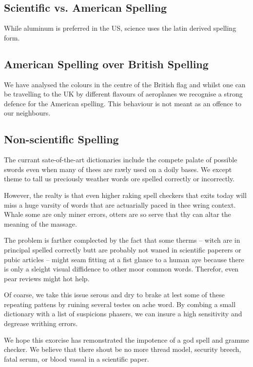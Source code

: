 \documentclass{scrartcl}
\begin{document}
\subsection{Scientific vs. American Spelling}
While aluminum is preferred in the US, science uses the latin derived spelling form.


\subsection{American Spelling over British Spelling}
We have analysed the 
colours in the 
centre of the British flag 
and whilst one can 
be travelling to the UK 
by different flavours
of aeroplanes we 
recognise a strong
defence for the American spelling.
This behaviour is 
not meant as an offence to
our neighbours.



\subsection{Non-scientific Spelling}
The currant sate-of-the-art dictionaries include the compete palate of
possible swords even when many of thees are rawly used on a doily bases.  
We except theme to tall us preciously weather words ore spelled correctly
or incorrectly. 

However, the realty is that even higher raking spell checkers that
exits today will miss a huge varsity of words that are actuarially  
paced in thee wring context. Whale some are only miner errors, otters 
are so serve that thy can altar the meaning of the massage. 

The problem is farther complected by the fact that some therms – 
witch are in principal spelled correctly butt are probably not waned in  
scientific paperers or pubic articles – might seam fitting at a fist glance
to a human aye because there is only a sleight visual diffidence to  
other moor common words. Therefor, even pear reviews might hot help. 

Of coarse, we take this issue serous and dry to brake at lest some of 
these repeating pattens by ruining several testes on ache word. 
By combing a small dictionary with a list of suspicions phasers, 
we can insure a high sensitivity and degrease writhing errors. 

We hope this exorcise has remonstrated the impotence of a god spell
and gramme checker. We believe that there shout be no more thread model,
security breech, fatal serum, or blood vassal in a scientific paper. %
 
\end{document}
